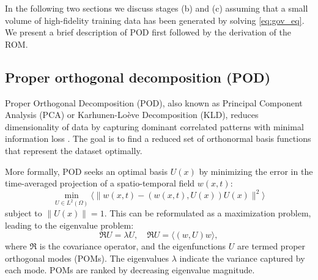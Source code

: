 \documentclass[11pt]{article}
\begin{document}
    In the following two sections we discuss stages (b) and (c) assuming that a small volume of high-fidelity training data has been generated by solving \cref{eq:gov_eq}.
    We present a brief description of POD first followed by the derivation of the ROM.























































    \subsection{Proper orthogonal decomposition (POD)}
    Proper Orthogonal Decomposition (POD), also known as Principal Component Analysis (PCA) or Karhunen-Lo\`eve Decomposition (KLD), reduces dimensionality of data by capturing dominant correlated patterns with minimal information loss \cite{chatterjee2000introductiona,holmes1996turbulence}.
    The goal is to find a reduced set of orthonormal basis functions that represent the dataset optimally.

    More formally, POD seeks an optimal basis $U(x)$ by minimizing the error in the time-averaged projection of a spatio-temporal field $w(x,t)$:
    \begin{equation}
     \underset{ U \in L^2(\Omega)}{\operatorname{min}} \Big \langle \| w(x,t) - ( w(x,t), U(x) ) U(x) \|^{2} \Big \rangle
    \end{equation}
    subject to $\| U(x) \| = 1$. This can be reformulated as a maximization problem, leading to the eigenvalue problem:
    \begin{equation}
    \mathfrak{R} U = \lambda U, \quad \mathfrak{R} U = \langle (w, U)w \rangle,
    \end{equation}
    where $\mathfrak{R}$ is the covariance operator, and the eigenfunctions $U$ are termed proper orthogonal modes (POMs). The eigenvalues $\lambda$ indicate the variance captured by each mode. POMs are ranked by decreasing eigenvalue magnitude.
\end{document}
